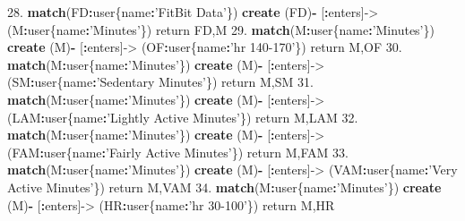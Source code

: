 \documentclass[]{book}
\newenvironment{Shaded}{\begin{snugshade}}{\end{snugshade}}
\newcommand{\KeywordTok}[1]{\textcolor[rgb]{0.13,0.29,0.53}{\textbf{#1}}}
\newcommand{\FloatTok}[1]{\textcolor[rgb]{0.00,0.00,0.81}{#1}}
\newcommand{\StringTok}[1]{\textcolor[rgb]{0.31,0.60,0.02}{#1}}
\newcommand{\OperatorTok}[1]{\textcolor[rgb]{0.81,0.36,0.00}{\textbf{#1}}}
\newcommand{\NormalTok}[1]{#1}
\begin{document}
\begin{Shaded}
\begin{Highlighting}[]
\FloatTok{28.} \KeywordTok{match}\NormalTok{(FD}\OperatorTok{:}\NormalTok{user\{name}\OperatorTok{:}\StringTok{'FitBit Data'}\NormalTok{\}) }\KeywordTok{create}\NormalTok{ (FD)}\OperatorTok{-}\StringTok{ }\NormalTok{[}\OperatorTok{:}\NormalTok{enters]->}\StringTok{ }\NormalTok{(M}\OperatorTok{:}\NormalTok{user\{name}\OperatorTok{:}\StringTok{'Minutes'}\NormalTok{\}) return FD,M}
\FloatTok{29.} \KeywordTok{match}\NormalTok{(M}\OperatorTok{:}\NormalTok{user\{name}\OperatorTok{:}\StringTok{'Minutes'}\NormalTok{\}) }\KeywordTok{create}\NormalTok{ (M)}\OperatorTok{-}\StringTok{ }\NormalTok{[}\OperatorTok{:}\NormalTok{enters]->}\StringTok{ }\NormalTok{(OF}\OperatorTok{:}\NormalTok{user\{name}\OperatorTok{:}\StringTok{'hr 140-170'}\NormalTok{\}) return M,OF}
\FloatTok{30.} \KeywordTok{match}\NormalTok{(M}\OperatorTok{:}\NormalTok{user\{name}\OperatorTok{:}\StringTok{'Minutes'}\NormalTok{\}) }\KeywordTok{create}\NormalTok{ (M)}\OperatorTok{-}\StringTok{ }\NormalTok{[}\OperatorTok{:}\NormalTok{enters]->}\StringTok{ }\NormalTok{(SM}\OperatorTok{:}\NormalTok{user\{name}\OperatorTok{:}\StringTok{'Sedentary Minutes'}\NormalTok{\}) return M,SM}
\FloatTok{31.} \KeywordTok{match}\NormalTok{(M}\OperatorTok{:}\NormalTok{user\{name}\OperatorTok{:}\StringTok{'Minutes'}\NormalTok{\}) }\KeywordTok{create}\NormalTok{ (M)}\OperatorTok{-}\StringTok{ }\NormalTok{[}\OperatorTok{:}\NormalTok{enters]->}\StringTok{ }\NormalTok{(LAM}\OperatorTok{:}\NormalTok{user\{name}\OperatorTok{:}\StringTok{'Lightly Active Minutes'}\NormalTok{\}) return M,LAM}
\FloatTok{32.} \KeywordTok{match}\NormalTok{(M}\OperatorTok{:}\NormalTok{user\{name}\OperatorTok{:}\StringTok{'Minutes'}\NormalTok{\}) }\KeywordTok{create}\NormalTok{ (M)}\OperatorTok{-}\StringTok{ }\NormalTok{[}\OperatorTok{:}\NormalTok{enters]->}\StringTok{ }\NormalTok{(FAM}\OperatorTok{:}\NormalTok{user\{name}\OperatorTok{:}\StringTok{'Fairly Active Minutes'}\NormalTok{\}) return M,FAM}
\FloatTok{33.} \KeywordTok{match}\NormalTok{(M}\OperatorTok{:}\NormalTok{user\{name}\OperatorTok{:}\StringTok{'Minutes'}\NormalTok{\}) }\KeywordTok{create}\NormalTok{ (M)}\OperatorTok{-}\StringTok{ }\NormalTok{[}\OperatorTok{:}\NormalTok{enters]->}\StringTok{ }\NormalTok{(VAM}\OperatorTok{:}\NormalTok{user\{name}\OperatorTok{:}\StringTok{'Very Active Minutes'}\NormalTok{\}) return M,VAM}
\FloatTok{34.} \KeywordTok{match}\NormalTok{(M}\OperatorTok{:}\NormalTok{user\{name}\OperatorTok{:}\StringTok{'Minutes'}\NormalTok{\}) }\KeywordTok{create}\NormalTok{ (M)}\OperatorTok{-}\StringTok{ }\NormalTok{[}\OperatorTok{:}\NormalTok{enters]->}\StringTok{ }\NormalTok{(HR}\OperatorTok{:}\NormalTok{user\{name}\OperatorTok{:}\StringTok{'hr 30-100'}\NormalTok{\}) return M,HR}

\end{Highlighting}
\end{Shaded}
\end{document}
